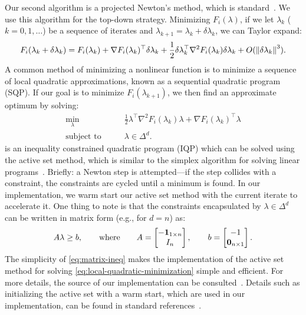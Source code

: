 \documentclass[eikonal.tex]{subfiles}
\begin{document}
Our second algorithm is a projected Newton's method, which is
standard~\cite{bertsekas1999nonlinear,nocedal2006numerical}. We use
this algorithm for the top-down strategy. Minimizing $F_i(\lambda)$,
if we let $\lambda_k$ ($k = 0, 1, \hdots$) be a sequence of iterates
and $\lambda_{k+1} = \lambda_k + \delta\lambda_k$, we can Taylor
expand:
\begin{equation}
  F_i(\lambda_k + \delta\lambda_k) = F_i(\lambda_k) + \nabla F_i(\lambda_k)^\top \delta\lambda_k + \frac{1}{2} \delta\lambda_k^\top \nabla^2 F_i(\lambda_k) \delta\lambda_k + O(\left\|\delta\lambda_k\right\|^3).
\end{equation}
A common method of minimizing a nonlinear function is to minimize a
sequence of local quadratic approximations, known as a sequential
quadratic program (SQP). If our goal is to minimize
$F_i(\lambda_{k+1})$, we then find an approximate optimum by solving:
\begin{equation}\label{eq:local-quadratic-minimization}
  \begin{split}
    \min_{\lambda} &\qquad \frac{1}{2} \lambda^\top \nabla^2 F_i(\lambda_k) \lambda + \nabla F_i(\lambda_k)^\top \lambda \\
    \text{subject to} &\qquad \lambda \in \Delta^d.
  \end{split}
\end{equation}
 is an inequality constrained
quadratic program (IQP) which can be solved using the active set
method, which is similar to the simplex algorithm for solving linear
programs~\cite{nocedal2006numerical}. Briefly: a Newton step is
attempted---if the step collides with a constraint, the constraints
are cycled until a minimum is found. In our implementation, we warm
start our active set method with the current iterate to accelerate
it. One thing to note is that the constraints encapsulated by
$\lambda \in \Delta^d$ can be written in matrix form (e.g., for
$d = n$) as:
\begin{equation}
  \label{eq:matrix-ineq}
  A \lambda \geq b, \qquad \text{where} \qquad A = \begin{bmatrix}
    -\m{1}_{1 \times n} \\ I_n
  \end{bmatrix}, \qquad b = \begin{bmatrix} -1 \\ \m{0}_{n \times 1} \end{bmatrix}.
\end{equation}
The simplicity of \cref{eq:matrix-ineq} makes the implementation of
the active set method for solving
\cref{eq:local-quadratic-minimization} simple and efficient. For more
details, the source of our implementation can be
consulted~\cite{sfp-umiacs-homepage}. Details such as initializing the
active set with a warm start, which are used in our implementation,
can be found in standard references~\cite{nocedal2006numerical}.
\end{document}
